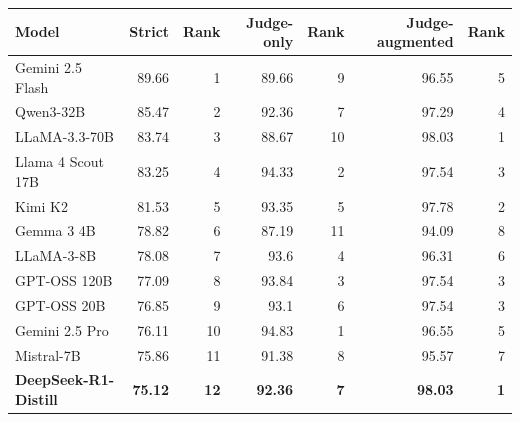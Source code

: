 \begin{tabular}{lrrrrrr}
\toprule
Model & Strict & Rank & Judge-only & Rank & Judge-augmented & Rank \\
\midrule
Gemini 2.5 Flash & 89.66 & 1 & 89.66 & 9 & 96.55 & 5 \\
Qwen3-32B & 85.47 & 2 & 92.36 & 7 & 97.29 & 4 \\
LLaMA-3.3-70B & 83.74 & 3 & 88.67 & 10 & 98.03 & 1 \\
Llama 4 Scout 17B & 83.25 & 4 & 94.33 & 2 & 97.54 & 3 \\
Kimi K2 & 81.53 & 5 & 93.35 & 5 & 97.78 & 2 \\
Gemma 3 4B & 78.82 & 6 & 87.19 & 11 & 94.09 & 8 \\
LLaMA-3-8B & 78.08 & 7 & 93.6 & 4 & 96.31 & 6 \\
GPT-OSS 120B & 77.09 & 8 & 93.84 & 3 & 97.54 & 3 \\
GPT-OSS 20B & 76.85 & 9 & 93.1 & 6 & 97.54 & 3 \\
Gemini 2.5 Pro & 76.11 & 10 & 94.83 & 1 & 96.55 & 5 \\
Mistral-7B & 75.86 & 11 & 91.38 & 8 & 95.57 & 7 \\
\textbf{DeepSeek-R1-Distill} & \textbf{75.12} & \textbf{12} & \textbf{92.36} & \textbf{7} & \textbf{98.03} & \textbf{1} \\
\bottomrule
\end{tabular}
